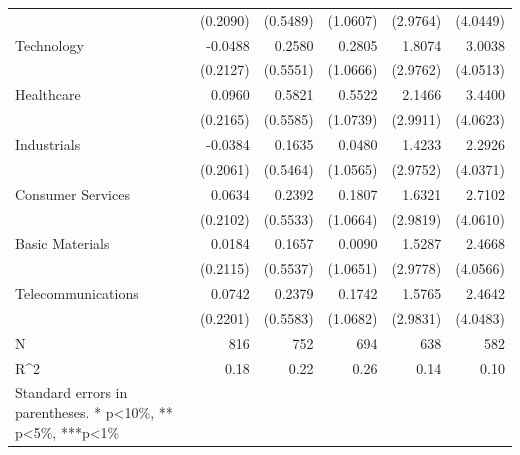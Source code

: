 \begin{table}[H]
{\begin{tabular}{lrrrrr}
                   & (0.2090)  & (0.5489)  & (1.0607)   & (2.9764)  & (4.0449)   \\
Technology         & -0.0488   & 0.2580    & 0.2805     & 1.8074    & 3.0038     \\
                   & (0.2127)  & (0.5551)  & (1.0666)   & (2.9762)  & (4.0513)   \\
Healthcare         & 0.0960    & 0.5821    & 0.5522     & 2.1466    & 3.4400     \\
                   & (0.2165)  & (0.5585)  & (1.0739)   & (2.9911)  & (4.0623)   \\
Industrials        & -0.0384   & 0.1635    & 0.0480     & 1.4233    & 2.2926     \\
                   & (0.2061)  & (0.5464)  & (1.0565)   & (2.9752)  & (4.0371)   \\
Consumer Services  & 0.0634    & 0.2392    & 0.1807     & 1.6321    & 2.7102     \\
                   & (0.2102)  & (0.5533)  & (1.0664)   & (2.9819)  & (4.0610)   \\
Basic Materials    & 0.0184    & 0.1657    & 0.0090     & 1.5287    & 2.4668     \\
                   & (0.2115)  & (0.5537)  & (1.0651)   & (2.9778)  & (4.0566)   \\
Telecommunications & 0.0742    & 0.2379    & 0.1742     & 1.5765    & 2.4642     \\
                   & (0.2201)  & (0.5583)  & (1.0682)   & (2.9831)  & (4.0483)   \\
N                  & 816       & 752       & 694        & 638       & 582        \\
R^2                 & 0.18      & 0.22      & 0.26       & 0.14      & 0.10       \\
   \bottomrule
Standard errors in parentheses.
* p<10\%, ** p<5\%, ***p<1\%
\end{tabular}}
\end{table} 

